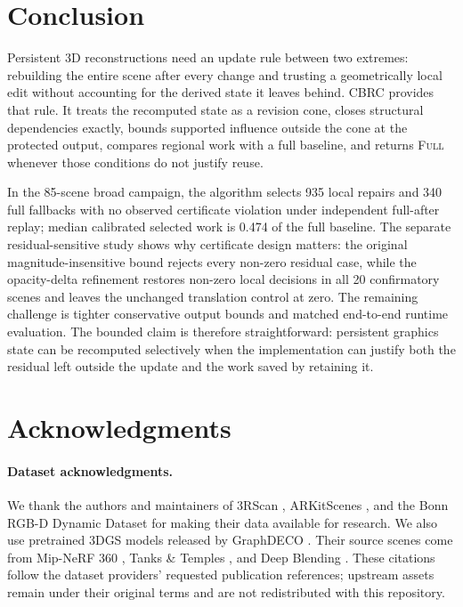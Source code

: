 \documentclass[acmtog,nonacm]{acmart}
\newcommand{\method}{CBRC}
\newcommand{\FULL}{\textsc{Full}}
\begin{document}
\section{Conclusion}
Persistent 3D reconstructions need an update rule between two extremes: rebuilding the entire scene after every change and trusting a geometrically local edit without accounting for the derived state it leaves behind. \method{} provides that rule. It treats the recomputed state as a revision cone, closes structural dependencies exactly, bounds supported influence outside the cone at the protected output, compares regional work with a full baseline, and returns \FULL{} whenever those conditions do not justify reuse.

In the 85-scene broad campaign, the algorithm selects 935 local repairs and 340 full fallbacks with no observed certificate violation under independent full-after replay; median calibrated selected work is 0.474 of the full baseline. The separate residual-sensitive study shows why certificate design matters: the original magnitude-insensitive bound rejects every non-zero residual case, while the opacity-delta refinement restores non-zero local decisions in all 20 confirmatory scenes and leaves the unchanged translation control at zero. The remaining challenge is tighter conservative output bounds and matched end-to-end runtime evaluation. The bounded claim is therefore straightforward: persistent graphics state can be recomputed selectively when the implementation can justify both the residual left outside the update and the work saved by retaining it.


\section*{Acknowledgments}
\paragraph{Dataset acknowledgments.}
We thank the authors and maintainers of 3RScan \citep{wald2019rio}, ARKitScenes \citep{baruch2021arkitscenes}, and the Bonn RGB-D Dynamic Dataset \citep{palazzolo2019refusion} for making their data available for research. We also use pretrained 3DGS models released by GraphDECO \citep{kerbl2023gaussians}. Their source scenes come from Mip-NeRF 360 \citep{barron2022mipnerf360}, Tanks \& Temples \citep{knapitsch2017tandt}, and Deep Blending \citep{hedman2018deepblending}. These citations follow the dataset providers' requested publication references; upstream assets remain under their original terms and are not redistributed with this repository.
\end{document}
